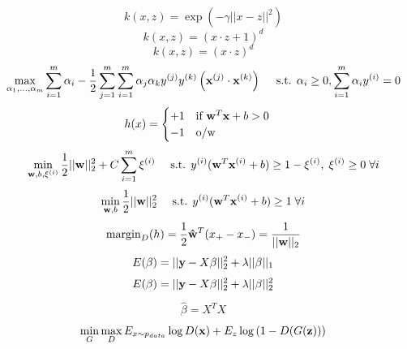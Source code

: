 \documentclass[10pt,fleqn]{minimal}
\begin{document}
{{\begin{equation}
	k(x,z) = \exp \left( -\gamma ||x-z||^2 \right)
\end{equation}
\begin{equation}
	k(x,z) = (x \cdot z + 1)^d
\end{equation}
\begin{equation}
	k(x,z) = (x \cdot z)^d
\end{equation}
\begin{equation}
	\max_{\alpha_1,\dots, \alpha_m} \sum_{i=1}^m \alpha_i - \frac{1}{2} \sum_{j=1}^m \sum_{i=1}^m \alpha_j \alpha_k y^{(j)} y^{(k)} \left(\bold{x}^{(j)} \cdot \bold{x}^{(k)} \right) \quad \text{ s.t. } \alpha_i \geq 0, \sum_{i=1}^m \alpha_i y^{(i)} = 0
\end{equation}
\begin{equation}
	h(x) = \begin{cases} +1 \quad \text{if } \bold{w}^T \bold{x} + b > 0 \\ -1 \quad \text{o/w} \end{cases}
\end{equation}
\begin{equation}
	\min_{\bold{w},b,\xi^{(i)}} \frac{1}{2} || \bold{w}||_2^2 + C \sum_{i=1}^m \xi^{(i)}\quad \text{ s.t. } y^{(i)} (\bold{w}^T \bold{x}^{(i)} + b) \geq 1-\xi^{(i)}, \; \xi^{(i)} \geq 0 \; \forall i
\end{equation}
\begin{equation}
	\min_{\bold{w},b} \frac{1}{2} || \bold{w}||_2^2 \quad \text{ s.t. } y^{(i)} (\bold{w}^T \bold{x}^{(i)} + b) \geq 1 \; \forall i
\end{equation}
\begin{equation}
	\text{margin}_D (h) = \frac{1}{2} \bold{\hat{w}}^T (x_+ - x_-) = \frac{1}{||\bold{w}||_2}
\end{equation}
\begin{align}
	E(\bold{\beta}) = || \bold{y} - X \bold{\beta} ||_2^2  + \lambda ||\bold{\beta}||_1
\end{align}
\begin{align}
	E(\bold{\beta}) = || \bold{y} - X \bold{\beta} ||_2^2  + \lambda ||\bold{\beta}||_2^2
\end{align}
\begin{align}
	\hat{\beta} = X^TX
\end{align}
\begin{align}
	\min_G \max_D E_{x \sim p_{data}} \log D(\bold{x}) + E_{z} \log \left(1 - D(G(\bold{z})) \right) \\
\end{align}
}}
\end{document}

